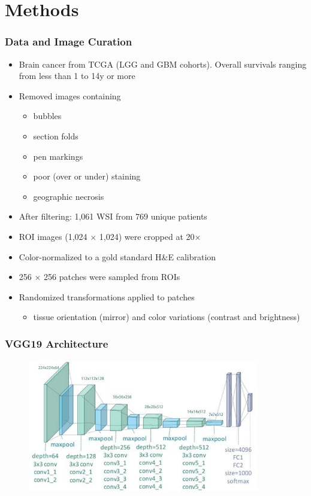 \documentclass[usenames,dvipsnames]{beamer}
\begin{document}
\section{Methods}\label{sec:methods}
\begin{frame}
  \frametitle{Data and Image Curation}
  \vspace{-0.5cm}
  \begin{itemize}
    \item Brain cancer from TCGA (LGG and GBM cohorts). Overall survivals
      ranging from less than 1 to 14y or more
    \item Removed images containing
    \begin{itemize}
      \item bubbles
      \item section folds
      \item pen markings
      \item poor (over or under) staining
      \item geographic necrosis
    \end{itemize}
    \item After filtering: 1,061 WSI from 769 unique patients
    \item ROI images (1,024 $\times$ 1,024) were cropped at 20$\times$
    \item Color-normalized to a gold standard H\&E calibration
    \item 256 $\times$ 256 patches were sampled from ROIs
    \item Randomized transformations applied to patches
    \begin{itemize}
      \item tissue orientation (mirror) and color variations (contrast and brightness)
    \end{itemize}
  \end{itemize}
\end{frame}
\begin{frame}
  \frametitle{VGG19 Architecture}
  \begin{figure}[ht]
    \centering
    \includegraphics[width=0.9\textwidth,keepaspectratio]{figures/vgg19.jpg}
    \caption*{\label{fig:vgg19}}
  \end{figure}
\end{frame}
\end{document}
